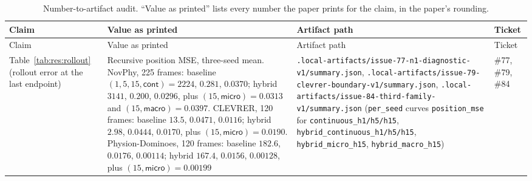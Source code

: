 {\footnotesize
\setlength{\tabcolsep}{3pt}
\begin{longtable}{@{}p{}p{}p{}p{}@{}}
\caption{Number-to-artifact audit. ``Value as printed'' lists every number the paper prints for the claim, in the paper's rounding.}\label{tab:app:audit}\\
\toprule
Claim & Value as printed & Artifact path & Ticket \\
\midrule
\endfirsthead
\toprule
Claim & Value as printed & Artifact path & Ticket \\
\midrule
\endhead
\bottomrule
\endfoot
Table~\ref{tab:res:rollout} (rollout error at the last endpoint) & Recursive position MSE, three-seed mean. NovPhy, 225 frames: baseline $(1,5,15,\textsf{cont}) = 2224$, $0.281$, $0.0370$; hybrid $3141$, $0.200$, $0.0296$, plus $(15,\textsf{micro}) = 0.0313$ and $(15,\textsf{macro}) = 0.0397$. CLEVRER, 120 frames: baseline $13.5$, $0.0471$, $0.0116$; hybrid $2.98$, $0.0444$, $0.0170$, plus $(15,\textsf{micro}) = 0.0190$. Physion-Dominoes, 120 frames: baseline $182.6$, $0.0176$, $0.00114$; hybrid $167.4$, $0.0156$, $0.00128$, plus $(15,\textsf{micro}) = 0.00199$ & \nolinkurl{.local-artifacts/issue-77-n1-diagnostic-v1/summary.json}, \nolinkurl{.local-artifacts/issue-79-clevrer-boundary-v1/summary.json}, \nolinkurl{.local-artifacts/issue-84-third-family-v1/summary.json} (\texttt{per\_seed} curves \texttt{position\_mse} for \texttt{continuous\_h1/h5/h15}, \texttt{hybrid\_continuous\_h1/h5/h15}, \texttt{hybrid\_micro\_h15}, \texttt{hybrid\_macro\_h15}) & \#77, \#79, \#84 \\

\end{longtable}}
